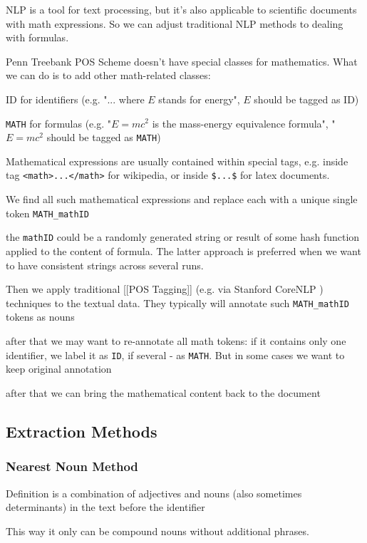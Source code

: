 NLP is a tool for text processing, but it's also applicable to scientific documents with math expressions. So we can adjust traditional NLP methods to dealing with formulas.


Penn Treebank POS Scheme \cite{santorini1990part}  doesn't have special classes for mathematics.
What we can do is to add other math-related classes:

ID for identifiers (e.g. "... where $E$ stands for energy", $E$ should be tagged as ID)

\verb|MATH| for formulas (e.g. "$E = mc^2$ is the mass-energy equivalence formula", "$E = mc^2$ should be tagged as \verb|MATH|)

Mathematical expressions are usually contained within special tags, e.g. inside
tag \verb|<math>...</math>| for wikipedia, or inside \verb|$...$| for 
latex documents.

We find all such mathematical expressions and replace each with a unique single token \verb|MATH_mathID|

the \verb|mathID| could be a randomly generated string or result of some hash function 
applied to the content of formula. The latter approach is preferred when we want 
to have consistent strings across several runs.

Then we apply traditional [[POS Tagging]] (e.g. via Stanford 
CoreNLP \cite{manning2014stanford})
techniques to the textual data. They typically will annotate such \verb|MATH_mathID|
tokens as nouns

after that we may want to re-annotate all math tokens: if it contains only 
one identifier, we label it as \verb|ID|, if several - as \verb|MATH|. But in some cases 
we want to keep original annotation

after that we can bring the mathematical content back to the document



\subsection{Extraction Methods}
\subsubsection{Nearest Noun Method}
Definition is a combination of adjectives and nouns (also sometimes determinants) in the text before the identifier

\cite{grigore2009towards}
\cite{yokoi2011contextual}


This way it only can be compound nouns without additional phrases.


